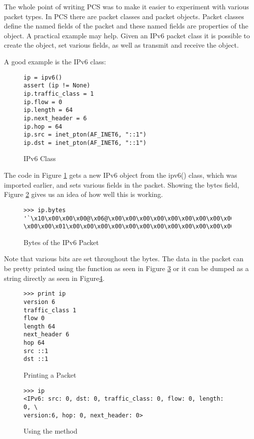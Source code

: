 \documentclass[11pt]{article}
\begin{document}
The whole point of writing PCS was to make it easier to experiment
with various packet types.  In PCS there are packet classes and packet
objects.  Packet classes define the named fields of the packet and
these named fields are properties of the object.  A practical example
may help.  Given an IPv6 packet class it is possible to create the
object, set various fields, as well as transmit and receive the
object.

A good example is the IPv6 class:
\begin{figure}
  \centering
\begin{lstlisting}
ip = ipv6()
assert (ip != None)
ip.traffic_class = 1
ip.flow = 0
ip.length = 64
ip.next_header = 6
ip.hop = 64
ip.src = inet_pton(AF_INET6, "::1")
ip.dst = inet_pton(AF_INET6, "::1")
\end{lstlisting}
  \caption{IPv6 Class}
  \label{fig:ipv6-class}
\end{figure}
The code in Figure \ref{fig:ipv6-class} gets a new IPv6 object from
the ipv6() class, which was imported earlier, and sets various fields
in the packet.  Showing the bytes field, Figure
\ref{fig:bytes-ipv6-packet} gives us an idea of how well this is
working.

\begin{figure}
  \centering
\begin{Verbatim}
>>> ip.bytes
'`\x10\x00\x00\x00@\x06@\x00\x00\x00\x00\x00\x00\x00\x00\x00\x00\x00\x00\x00
\x00\x00\x01\x00\x00\x00\x00\x00\x00\x00\x00\x00\x00\x00\x00\x00\x00\x00\x01'
\end{Verbatim}
  \caption{Bytes of the IPv6 Packet}
  \label{fig:bytes-ipv6-packet}
\end{figure}

Note that various bits are set throughout the bytes.  The data in the
packet can be pretty printed using the  function as
seen in Figure \ref{fig:printing-a-packet} or it can be dumped as a
string directly as seen in Figure\ref{fig:repr-method}.

\begin{figure}
  \centering
\begin{lstlisting}
>>> print ip
version 6
traffic_class 1
flow 0
length 64
next_header 6
hop 64
src ::1
dst ::1
\end{lstlisting}
  \caption{Printing a Packet}
  \label{fig:printing-a-packet}
\end{figure}

\begin{figure}[h]
  \centering
  \begin{Verbatim}
>>> ip
<IPv6: src: 0, dst: 0, traffic_class: 0, flow: 0, length: 0, \
version:6, hop: 0, next_header: 0>
\end{Verbatim}
    \caption{Using the  method}
    \label{fig:repr-method}
  \end{figure}
\end{document}

